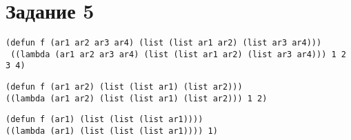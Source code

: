 \section{Задание 5}
\begin{center}
	\begin{lstlisting}[label=b5, caption={Выражение 1}]
(defun f (ar1 ar2 ar3 ar4) (list (list ar1 ar2) (list ar3 ar4)))
 ((lambda (ar1 ar2 ar3 ar4) (list (list ar1 ar2) (list ar3 ar4))) 1 2 3 4)
	\end{lstlisting}
	\begin{lstlisting}[label=a5, caption={Выражение 2}]
(defun f (ar1 ar2) (list (list ar1) (list ar2)))
((lambda (ar1 ar2) (list (list ar1) (list ar2))) 1 2)
	\end{lstlisting}
	\begin{lstlisting}[label=c5, caption={Выражение 3}]
(defun f (ar1) (list (list (list ar1))))
((lambda (ar1) (list (list (list ar1)))) 1)
	\end{lstlisting}
\end{center}
\begin{center}	
	\centering
	\def\svgwidth{14cm}
	
	\label{ris:NRL2d}
\end{center}